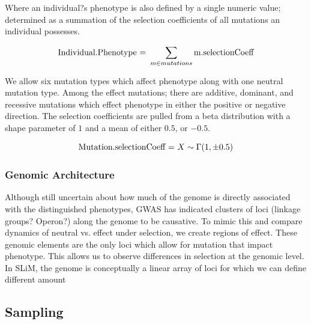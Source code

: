 \documentclass{article}
\begin{document}
Where an individual?s phenotype is also defined by a single numeric value; 
determined as a summation of the selection coefficients of all mutations an individual possesses. 

	\[
{\textnormal{Individual.Phenotype = } \sum_{m \in mutations} \textnormal{m.selectionCoeff}}
	\]
    
    
We allow six mutation types which affect phenotype along with one neutral mutation type.
Among the effect mutations; 
there are additive, dominant, and recessive mutations which effect phenotype
in either the positive or negative direction. 
The selection coefficients are pulled from a beta distribution 
with a shape parameter of $1$ and a mean of either $0.5$, or ${-0.5}$. 

	\[
\textnormal{Mutation.selectionCoeff = } X \sim \Gamma (1,\pm0.5)
	\]


\subsubsection{Genomic Architecture}

Although still uncertain about how much of the genome is directly associated with the distinguished phenotypes, 
GWAS has indicated clusters of loci (linkage groups? Operon?) along the genome to be causative. 
To mimic this and compare dynamics of neutral vs. effect under selection, 
we create regions of effect. These genomic elements are the only loci which allow for mutation that impact phenotype. 
This allows us to observe differences in selection at the genomic level. 
In SLiM, the genome is conceptually a linear array of loci for which we can define
different amount 


\subsection{Sampling}

\end{document}
